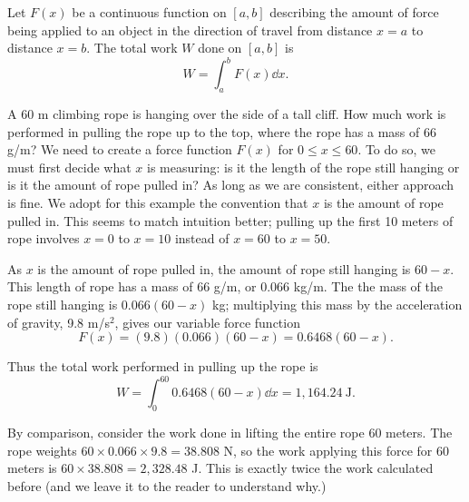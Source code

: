 \begin{keyidea}[Work]\label{idea:work}%
Let $F(x)$ be a continuous function on $[a,b]$ describing the amount of force being applied to an object in the direction of travel from distance $x=a$ to distance $x=b$. The total work $W$ done on $[a,b]$ is
\[W = \int_a^b F(x)\dd x.\]
\end{keyidea}


\begin{example}\label{ex_work1}%
A 60 m climbing rope is hanging over the side of a tall cliff. How much work is performed in pulling the rope up to the top, where the rope has a mass of 66 g/m? 
\solution
We need to create a force function $F(x)$ for $0\le x\le60$. To do so, we must first decide what $x$ is measuring: is it the length of the rope still hanging or is it the amount of rope pulled in? As long as we are consistent, either approach is fine. We adopt for this example the convention that $x$ is the amount of rope pulled in. This seems to match intuition better; pulling up the first 10 meters of rope involves $x=0$ to $x=10$ instead of $x=60$ to $x=50$. 

As $x$ is the amount of rope pulled in, the amount of rope still hanging is $60-x$. This length of rope has a mass of 66 g/m, or $0.066$ kg/m. The the mass of the rope still hanging is $0.066(60-x)$ kg; multiplying this mass by the acceleration of gravity, 9.8 m/s$^2$, gives our variable force function
\[F(x) = (9.8)(0.066)(60-x) = 0.6468(60-x).\]

Thus the total work performed in pulling up the rope is 
\[W = \int_0^{60} 0.6468(60-x)\dd x = 1,164.24\ \text{J}.\]

By comparison, consider the work done in lifting the entire rope 60 meters. The rope weights $60\times 0.066 \times 9.8 = 38.808$ N, so the work applying this force for 60 meters is $60\times 38.808 = 2,328.48$ J. This is exactly twice the work calculated before (and we leave it to the reader to understand why.)
\end{example}

